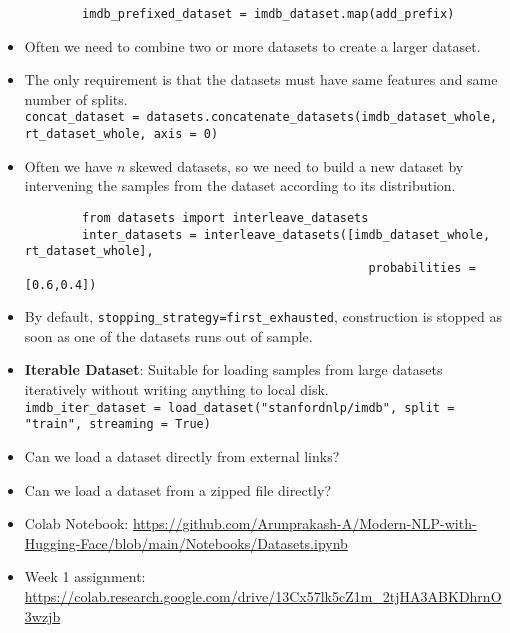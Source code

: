 \documentclass[a4paper]{article}
\begin{document}
\begin{itemize}
\begin{verbatim}
        imdb_prefixed_dataset = imdb_dataset.map(add_prefix)
    \end{verbatim}
    \vspace{-7mm}
    \item Often we need to combine two or more datasets to create a larger dataset.
    \item The only requirement is that the datasets must have same features and same number of splits.\\
    \verb|concat_dataset = datasets.concatenate_datasets(imdb_dataset_whole, rt_dataset_whole, axis = 0)|
    \item Often we have $n$ skewed datasets, so we need to build a new dataset by intervening the samples from the dataset according to its distribution.
    \vspace{-1mm}
    \begin{verbatim}
        from datasets import interleave_datasets
        inter_datasets = interleave_datasets([imdb_dataset_whole, rt_dataset_whole],
                                                probabilities = [0.6,0.4])
    \end{verbatim}
    \vspace{-7mm}
    \item By default, \verb|stopping_strategy=first_exhausted|, construction is stopped as soon as one of the datasets runs out of sample.
    \item \textbf{Iterable Dataset}: Suitable for loading samples from large datasets iteratively without writing anything to local disk.\\
    \verb|imdb_iter_dataset = load_dataset("stanfordnlp/imdb", split = "train", streaming = True)|
    \item Can we load a dataset directly from external links?
    \item Can we load a dataset from a zipped file directly?
    \item Colab Notebook: \url{https://github.com/Arunprakash-A/Modern-NLP-with-Hugging-Face/blob/main/Notebooks/Datasets.ipynb}
    \item Week 1 assignment: \url{https://colab.research.google.com/drive/13Cx57lk5cZ1m_2tjHA3ABKDhrnO3wzjb}
\end{itemize}
\end{document}

